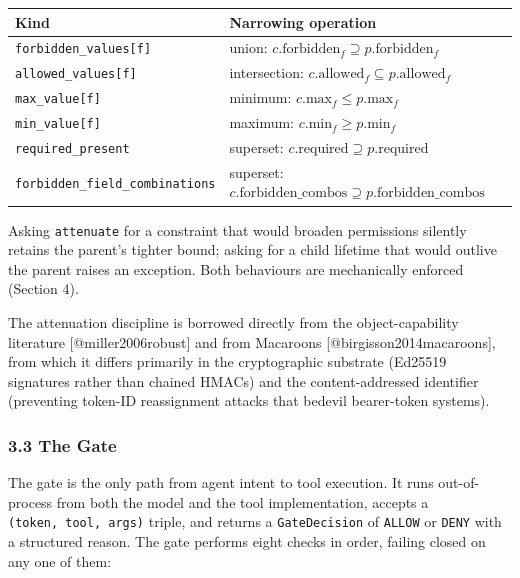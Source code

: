 \begin{longtable}[]{@{}
  >{\raggedright\arraybackslash}p{}
  >{\raggedright\arraybackslash}p{}@{}}
\toprule\noalign{}
\begin{minipage}[b]{\linewidth}\raggedright
Kind
\end{minipage} & \begin{minipage}[b]{\linewidth}\raggedright
Narrowing operation
\end{minipage} \\
\midrule\noalign{}
\endhead
\bottomrule\noalign{}
\endlastfoot
\texttt{forbidden\_values{[}f{]}} & union:
\(c.\text{forbidden}_f \supseteq p.\text{forbidden}_f\) \\
\texttt{allowed\_values{[}f{]}} & intersection:
\(c.\text{allowed}_f \subseteq p.\text{allowed}_f\) \\
\texttt{max\_value{[}f{]}} & minimum:
\(c.\text{max}_f \le p.\text{max}_f\) \\
\texttt{min\_value{[}f{]}} & maximum:
\(c.\text{min}_f \ge p.\text{min}_f\) \\
\texttt{required\_present} & superset:
\(c.\text{required} \supseteq p.\text{required}\) \\
\texttt{forbidden\_field\_combinations} & superset:
\(c.\text{forbidden\_combos} \supseteq p.\text{forbidden\_combos}\) \\
\end{longtable}

Asking \texttt{attenuate} for a constraint that would broaden
permissions silently retains the parent's tighter bound; asking for a
child lifetime that would outlive the parent raises an exception. Both
behaviours are mechanically enforced (Section 4).

The attenuation discipline is borrowed directly from the
object-capability literature {[}@miller2006robust{]} and from Macaroons
{[}@birgisson2014macaroons{]}, from which it differs primarily in the
cryptographic substrate (Ed25519 signatures rather than chained HMACs)
and the content-addressed identifier (preventing token-ID reassignment
attacks that bedevil bearer-token systems).

\subsubsection{3.3 The Gate}\label{the-gate}

The gate is the only path from agent intent to tool execution. It runs
out-of-process from both the model and the tool implementation, accepts
a \texttt{(token,\ tool,\ args)} triple, and returns a
\texttt{GateDecision} of \texttt{ALLOW} or \texttt{DENY} with a
structured reason. The gate performs eight checks in order, failing
closed on any one of them:

